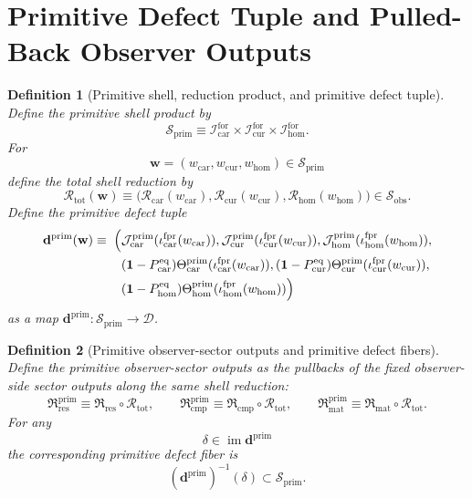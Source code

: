\documentclass[11pt]{article}
\newcommand{\Car}{\mathrm{car}}
\newcommand{\Cur}{\mathrm{cur}}
\newcommand{\Hom}{\mathrm{hom}}
\newcommand{\ForSpace}[1]{\mathcal I_{#1}^{\mathrm{for}}}
\newcommand{\ForPrimInc}[1]{\iota_{#1}^{\mathrm{fpr}}}
\newcommand{\Reduction}[1]{\mathcal R_{#1}}
\newcommand{\ReductionTriple}{\mathcal R_{\mathrm{tot}}}
\newcommand{\ObsShell}{\mathcal S_{\mathrm{obs}}}
\newcommand{\PrimShell}{\mathcal S_{\mathrm{prim}}}
\newcommand{\PrimCurrent}[1]{\mathcal J_{#1}^{\mathrm{prim}}}
\newcommand{\PrimTheta}[1]{\Theta_{#1}^{\mathrm{prim}}}
\newcommand{\EqProj}[1]{P_{#1}^{\mathrm{eq}}}
\newcommand{\DefectSpace}{\mathcal D}
\newcommand{\PrimDefectTuple}{\mathbf d^{\mathrm{prim}}}
\newcommand{\ObsResidualSector}{\mathfrak R_{\mathrm{res}}}
\newcommand{\ObsCompletionSector}{\mathfrak R_{\mathrm{cmp}}}
\newcommand{\ObsMatterSector}{\mathfrak R_{\mathrm{mat}}}
\newcommand{\PrimResidualSector}{\mathfrak R_{\mathrm{res}}^{\mathrm{prim}}}
\newcommand{\PrimCompletionSector}{\mathfrak R_{\mathrm{cmp}}^{\mathrm{prim}}}
\newcommand{\PrimMatterSector}{\mathfrak R_{\mathrm{mat}}^{\mathrm{prim}}}
\newtheorem{definition}{Definition}
\begin{document}
\section{Primitive Defect Tuple and Pulled-Back Observer Outputs}

\begin{definition}[Primitive shell, reduction product, and primitive defect tuple]
\label{def:primitive}
Define the primitive shell product by
\[
\PrimShell
\equiv
\ForSpace{\Car}\times\ForSpace{\Cur}\times\ForSpace{\Hom}.
\]
For
\[
\mathbf w=(w_{\Car},w_{\Cur},w_{\Hom})\in\PrimShell
\]
define the total shell reduction by
\[
\ReductionTriple(\mathbf w)
\equiv
\bigl(
\Reduction{\Car}(w_{\Car}),
\Reduction{\Cur}(w_{\Cur}),
\Reduction{\Hom}(w_{\Hom})
\bigr)
\in\ObsShell.
\]
Define the primitive defect tuple
\begin{equation}
\begin{aligned}
\PrimDefectTuple(\mathbf w)
\equiv\;
\Bigl(
&\PrimCurrent{\Car}(\ForPrimInc{\Car}(w_{\Car})),
\PrimCurrent{\Cur}(\ForPrimInc{\Cur}(w_{\Cur})),
\PrimCurrent{\Hom}(\ForPrimInc{\Hom}(w_{\Hom})),
\\
&(\mathbf 1-\EqProj{\Car})\PrimTheta{\Car}(\ForPrimInc{\Car}(w_{\Car})),
(\mathbf 1-\EqProj{\Cur})\PrimTheta{\Cur}(\ForPrimInc{\Cur}(w_{\Cur})),
\\
&
(\mathbf 1-\EqProj{\Hom})\PrimTheta{\Hom}(\ForPrimInc{\Hom}(w_{\Hom}))
\Bigr)
\end{aligned}
\label{eq:prim_tuple}
\end{equation}
as a map \(\PrimDefectTuple:\PrimShell\to\DefectSpace\).
\end{definition}

\begin{definition}[Primitive observer-sector outputs and primitive defect fibers]
\label{def:outputs}
Define the primitive observer-sector outputs as the pullbacks of the fixed observer-side sector outputs along the same shell reduction:
\begin{equation}
\PrimResidualSector
\equiv
\ObsResidualSector\circ\ReductionTriple,
\qquad
\PrimCompletionSector
\equiv
\ObsCompletionSector\circ\ReductionTriple,
\qquad
\PrimMatterSector
\equiv
\ObsMatterSector\circ\ReductionTriple.
\label{eq:pullback_outputs}
\end{equation}
For any
\[
\delta\in\operatorname{im}\PrimDefectTuple
\]
the corresponding \emph{primitive defect fiber} is
\[
(\PrimDefectTuple)^{-1}(\delta)
\subset\PrimShell.
\]
\end{definition}
\end{document}
